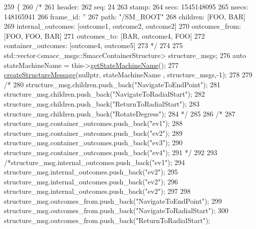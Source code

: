 \begin{DoxyCode}
259     \{
260     \textcolor{comment}{/*}
261 \textcolor{comment}{    header: }
262 \textcolor{comment}{    seq: 24}
263 \textcolor{comment}{    stamp: }
264 \textcolor{comment}{        secs: 1545148095}
265 \textcolor{comment}{        nsecs: 148165941}
266 \textcolor{comment}{    frame\_id: ''}
267 \textcolor{comment}{    path: "/SM\_ROOT"}
268 \textcolor{comment}{    children: [FOO, BAR]}
269 \textcolor{comment}{    internal\_outcomes: [outcome1, outcome2, outcome2]}
270 \textcolor{comment}{    outcomes\_from: [FOO, FOO, BAR]}
271 \textcolor{comment}{    outcomes\_to: [BAR, outcome4, FOO]}
272 \textcolor{comment}{    container\_outcomes: [outcome4, outcome5]}
273 \textcolor{comment}{    */}
274 
275     std::vector<smacc\_msgs::SmaccContainerStructure> structure\_msgs;
276     \textcolor{keyword}{auto} stateMachineName = this->\hyperlink{classsmacc_1_1ISmaccStateMachine_a2d0b1742f17dd77d5df217153e8b5259}{getStateMachineName}();
277     \hyperlink{structsmacc_1_1SmaccStateMachineBase_a060a552dce399a974a8e68d498fdfb6b}{createStructureMessage}(\textcolor{keyword}{nullptr}, stateMachineName , structure\_msgs,-1);
278 
279     \textcolor{comment}{/*}
280 \textcolor{comment}{    structure\_msg.children.push\_back("NavigateToEndPoint");}
281 \textcolor{comment}{    structure\_msg.children.push\_back("NavigateToRadialStart");}
282 \textcolor{comment}{    structure\_msg.children.push\_back("ReturnToRadialStart");}
283 \textcolor{comment}{    structure\_msg.children.push\_back("RotateDegress");         }
284 \textcolor{comment}{    */}
285 
286     \textcolor{comment}{/*}
287 \textcolor{comment}{    structure\_msg.container\_outcomes.push\_back("ev1");}
288 \textcolor{comment}{    structure\_msg.container\_outcomes.push\_back("ev2");}
289 \textcolor{comment}{    structure\_msg.container\_outcomes.push\_back("ev3");}
290 \textcolor{comment}{    structure\_msg.container\_outcomes.push\_back("ev4");}
291 \textcolor{comment}{    */}
292     
293     \textcolor{comment}{/*structure\_msg.internal\_outcomes.push\_back("ev1");}
294 \textcolor{comment}{    structure\_msg.internal\_outcomes.push\_back("ev2");}
295 \textcolor{comment}{    structure\_msg.internal\_outcomes.push\_back("ev2");}
296 \textcolor{comment}{    structure\_msg.internal\_outcomes.push\_back("ev2");}
297 \textcolor{comment}{}
298 \textcolor{comment}{    structure\_msg.outcomes\_from.push\_back("NavigateToEndPoint");}
299 \textcolor{comment}{    structure\_msg.outcomes\_from.push\_back("NavigateToRadialStart");}
300 \textcolor{comment}{    structure\_msg.outcomes\_from.push\_back("ReturnToRadialStart");}

\end{DoxyCode}
